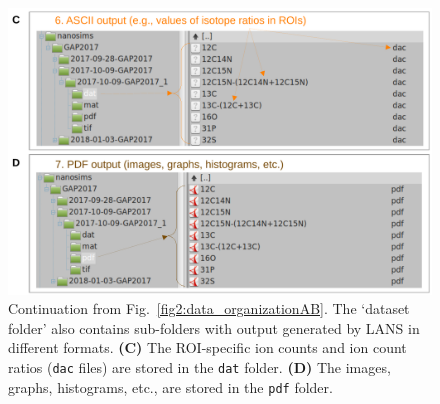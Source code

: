 \documentclass[a4paper, 11pt]{article}
\newcommand{\ttt}[1]{\texttt{#1}}
\newcounter{step}
\begin{document}
\begin{figure}[ht]
\centering
\includegraphics[scale=0.5]{figs2/folders_organizationCD}
\caption{\label{fig2:data_organizationCD}%
  Continuation from Fig.~\ref{fig2:data_organizationAB}. %
The `dataset folder' also contains sub-folders with output generated by LANS in different formats. %
    \textbf{(C)} The ROI-specific ion counts and ion count ratios (\ttt{dac} files) are stored in the \ttt{dat} folder. %
    \textbf{(D)} The images, graphs, histograms, etc., are stored in the \ttt{pdf} folder.}
\end{figure}


\end{document}
